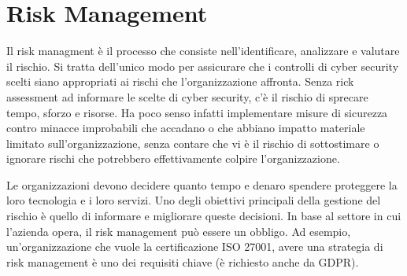 \chapter{Risk Management}

Il risk managment è il processo che consiste nell'identificare, analizzare e valutare il rischio. Si tratta dell'unico modo per assicurare che i controlli di cyber security scelti siano appropriati ai rischi che l'organizzazione affronta. Senza rick assessment ad informare le scelte di cyber security, c'è il rischio di sprecare tempo, sforzo e risorse. Ha poco senso infatti implementare misure di sicurezza contro minacce improbabili che accadano o che abbiano impatto materiale limitato sull'organizzazione, senza contare che vi è il rischio di sottostimare o ignorare rischi che potrebbero effettivamente colpire l'organizzazione. 

Le organizzazioni devono decidere quanto tempo e denaro spendere proteggere la loro tecnologia e i loro servizi. Uno degli obiettivi principali della gestione del rischio è quello di informare e migliorare queste decisioni. In base al settore in cui l'azienda opera, il risk management può essere un obbligo. Ad esempio, un'organizzazione che vuole la certificazione ISO 27001, avere una strategia di risk management è uno dei requisiti chiave (è richiesto anche da GDPR).
\\

